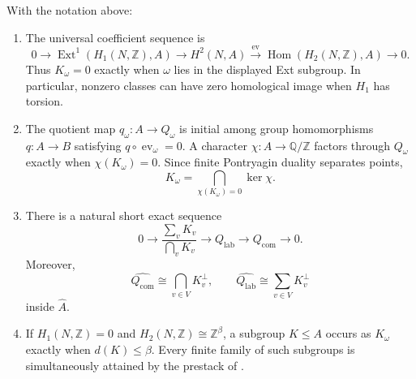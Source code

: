 \begin{proposition}
\label{prop:uct-aggregate-package}
With the notation above:
\begin{enumerate}[label=(\roman*),nosep]
\item The universal coefficient sequence is
      \[
      0\longrightarrow
      \operatorname{Ext}^1(H_1(N,\mathbb Z),A)
      \longrightarrow H^2(N,A)
      \xrightarrow{\operatorname{ev}}
      \operatorname{Hom}(H_2(N,\mathbb Z),A)
      \longrightarrow0.
      \]
      Thus \(K_\omega=0\) exactly when \(\omega\) lies in the displayed
      Ext subgroup.  In particular, nonzero classes can have zero
      homological image when \(H_1\) has torsion.
\item The quotient map \(q_\omega:A\to Q_\omega\) is initial among group
      homomorphisms \(q:A\to B\) satisfying
      \(q\circ\operatorname{ev}_\omega=0\).  A character
      \(\chi:A\to\mathbb Q/\mathbb Z\) factors through \(Q_\omega\)
      exactly when \(\chi(K_\omega)=0\).  Since finite Pontryagin duality
      separates points,
      \[
      K_\omega=\mathop{\bigcap}_{\chi(K_\omega)=0}\ker\chi.
      \]
\item There is a natural short exact sequence
      \begin{equation}\label{eq:aggregate-exact-sequence}
      0\longrightarrow
      \frac{\sum_vK_v}{\bigcap_vK_v}
      \longrightarrow Q_{\mathrm{lab}}
      \longrightarrow Q_{\mathrm{com}}
      \longrightarrow0.
      \end{equation}
      Moreover,
      \[
      \widehat{Q_{\mathrm{com}}}
      \cong\bigcap_{v\in V}K_v^\perp,
      \qquad
      \widehat{Q_{\mathrm{lab}}}
      \cong\sum_{v\in V}K_v^\perp
      \]
      inside \(\widehat A\).
\item If \(H_1(N,\mathbb Z)=0\) and
      \(H_2(N,\mathbb Z)\cong\mathbb Z^\beta\), a subgroup
      \(K\le A\) occurs as \(K_\omega\) exactly when \(d(K)\le\beta\).
      Every finite family of such subgroups is simultaneously attained by
      the prestack of
      .
\end{enumerate}
\end{proposition}

